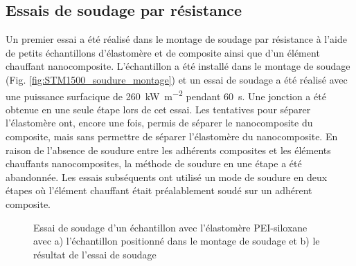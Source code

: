 \FloatBarrier

\subsection{Essais de soudage par résistance}

Un premier essai a été réalisé dans le montage de soudage par résistance à l'aide de petits échantillons d'élastomère et de composite ainsi que d'un élément chauffant nanocomposite. 
L'échantillon a été installé dans le montage de soudage (Fig. \ref{fig:STM1500_soudure_montage}) et un essai de soudage a été réalisé avec une puissance surfacique de \SI[locale=FR]{260}{\kilo\watt\per\square\metre} pendant \SI[locale=FR]{60}{\second}. 
Une jonction a été obtenue en une seule étape lors de cet essai. 
Les tentatives pour séparer l'élastomère ont, encore une fois, permis de séparer le nanocomposite du composite, mais sans permettre de séparer l'élastomère du nanocomposite. 
En raison de l'absence de soudure entre les adhérents composites et les éléments chauffants nanocomposites, la méthode de soudure en une étape a été abandonnée.
Les essais subséquents ont utilisé un mode de soudure en deux étapes où l'élément chauffant était préalablement soudé sur un adhérent composite. 

\FloatBarrier
\begin{figure}[h]
	\centering
	 \qquad
	\caption{Essai de soudage d'un échantillon avec l'élastomère PEI-siloxane avec a) l'échantillon positionné dans le montage de soudage et b) le résultat de l'essai de soudage}
	\label{fig:STM1500_soudure}
\end{figure}
\FloatBarrier

